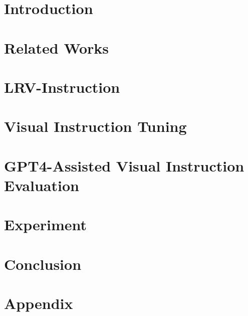 \documentclass[letterpaper,10pt]{article}
\begin{document}
\section{Introduction}

\label{sec:Introduction}

\section{Related Works}

\label{sec:related_work}


\section{LRV-Instruction}

\label{sec:dataset}

\section{Visual Instruction Tuning}

\label{sec:method}

\section{GPT4-Assisted Visual Instruction Evaluation}

\label{sec:Evaluation}

\section{Experiment}

\label{sec:Experiment}

\section{Conclusion}

\label{sec:Conclusion}






%
%
%


\clearpage
\appendix
\section{Appendix}

\label{sec:appendix}
\end{document}
